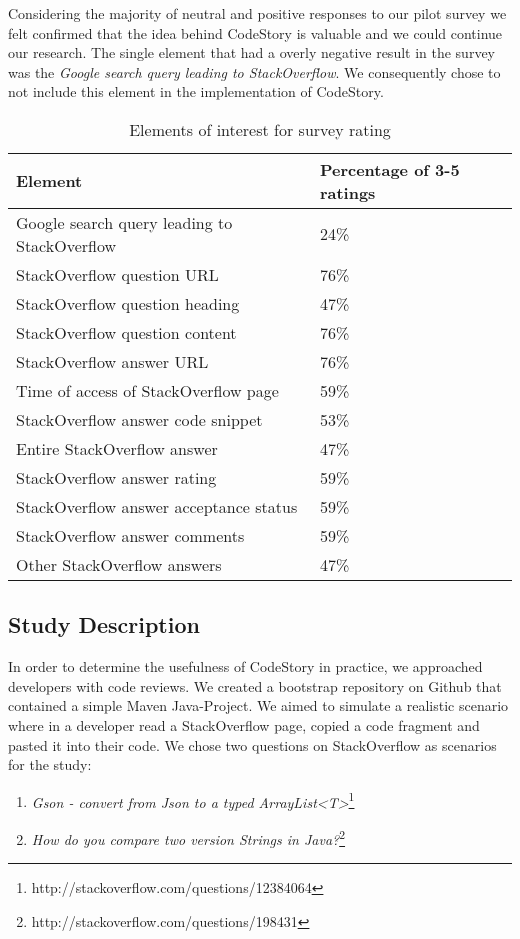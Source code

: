 \documentclass[../manifest.tex]{subfiles}
\begin{document}
Considering the majority of neutral and positive responses to our pilot survey we felt confirmed that the idea behind CodeStory is valuable and we could continue our research. The single element that had a overly negative result in the survey was the \textit{Google search query leading to StackOverflow}. We consequently chose to not include this element in the implementation of CodeStory.

\begin{table*}[t]
    \centering
    \begin{threeparttable}
    \begin{tabular*}{\textwidth}{ll}
    \hline
    \textbf{Element} & \textbf{Percentage of 3-5 ratings} \\
    \hline
    Google search query leading to StackOverflow & 24\% \\
    StackOverflow question URL & 76\% \\
    StackOverflow question heading & 47\% \\
    StackOverflow question content & 76\% \\
    StackOverflow answer URL & 76\% \\
    Time of access of StackOverflow page & 59\% \\
    StackOverflow answer code snippet & 53\% \\
    Entire StackOverflow answer & 47\% \\
    StackOverflow answer rating & 59\% \\
    StackOverflow answer acceptance status & 59\% \\
    StackOverflow answer comments & 59\% \\
    Other StackOverflow answers & 47\% \\
    \hline
    \end{tabular*}
    \end{threeparttable}
    \caption{Elements of interest for survey rating}
    \label{tab:elements-of-interest}
\end{table*}

\subsection{Study Description} \label{eval-description}

In order to determine the usefulness of CodeStory in practice, we approached developers with code reviews. We created a bootstrap repository on Github that contained a simple Maven Java-Project. We aimed to simulate a realistic scenario where in a developer read a StackOverflow page, copied a code fragment and pasted it into their code. We chose two questions on StackOverflow as scenarios for the study:
\begin{enumerate}
  \item \textit{Gson - convert from Json to a typed ArrayList<T>}\footnote{http://stackoverflow.com/questions/12384064}
  \item \textit{How do you compare two version Strings in Java?}\footnote{http://stackoverflow.com/questions/198431}
\end{enumerate}
\end{document}
